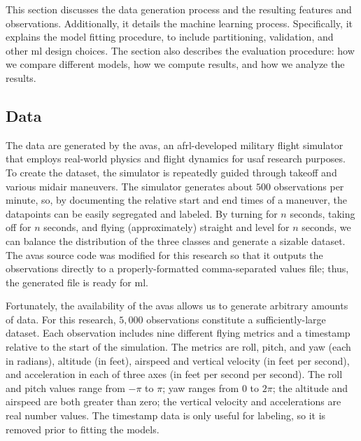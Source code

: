\documentclass[../main.tex]{subfiles}
\begin{document}

This section discusses the data generation process and the resulting features and observations. Additionally, it details the machine learning process. Specifically, it explains the model fitting procedure, to include partitioning, validation, and other \ac{ml} design choices. The section also describes the evaluation procedure: how we compare different models, how we compute results, and how we analyze the results.

\subsection{Data}


The data are generated by the \ac{avas}, an \ac{afrl}-developed military flight simulator that employs real-world physics and flight dynamics for \ac{usaf} research purposes. To create the dataset, the simulator is repeatedly guided through takeoff and various midair maneuvers. The simulator generates about $500$ observations per minute, so, by documenting the relative start and end times of a maneuver, the datapoints can be easily segregated and labeled. By turning for $n$ seconds, taking off for $n$ seconds, and flying (approximately) straight and level for $n$ seconds, we can balance the distribution of the three classes and generate a sizable dataset. The \ac{avas} source code was modified for this research so that it outputs the observations directly to a properly-formatted comma-separated values file; thus, the generated file is ready for \ac{ml}.


Fortunately, the availability of the \ac{avas} allows us to generate arbitrary amounts of data. For this research, $5,000$ observations constitute a sufficiently-large dataset. Each observation includes nine different flying metrics and a timestamp relative to the start of the simulation. The metrics are roll, pitch, and yaw (each in radians), altitude (in feet), airspeed and vertical velocity (in feet per second), and acceleration in each of three axes (in feet per second per second). The roll and pitch values range from $-\pi$ to $\pi$; yaw ranges from $0$ to $2\pi$; the altitude and airspeed are both greater than zero; the vertical velocity and accelerations are real number values. The timestamp data is only useful for labeling, so it is removed prior to fitting the models.
\end{document}
